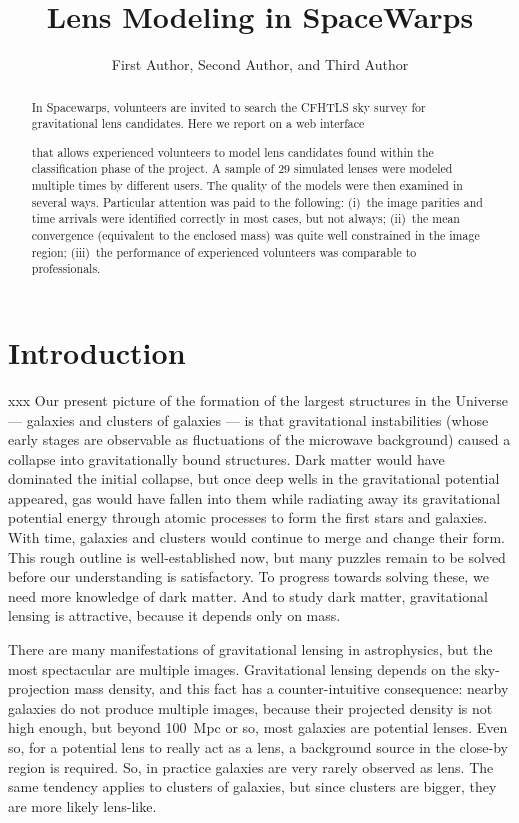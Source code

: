 \documentclass[12pt,preprint]{aastex}
\newcommand{\sw}{SpaceWarps\xspace}
\newcommand{\todo}[2][red]{%

\textcolor{#1}{\textbullet}%
\marginpar{\colorbox{#1}{\parbox{\marginparwidth}{%
\setstretch{0.4}\sffamily\textcolor{black}{\scriptsize{#2}}}}}}
\begin{document}
\title{Lens Modeling in \sw}
\author{First Author,
Second Author, and
Third Author}

\begin{abstract}
In Spacewarps, volunteers are invited to search the CFHTLS sky survey for
gravitational lens candidates.  Here we report on a web interface    \todo[red]{or should that be application?} that allows experienced
volunteers to model lens candidates found within the classification phase of the project. A sample of 29 simulated lenses
were modeled multiple times by different users.  The quality of the models were then
examined in several ways.  Particular attention was paid to the following: (i)~the image parities and
time arrivals were identified correctly in most cases, but not
always; (ii)~the mean convergence (equivalent to the enclosed mass)
was quite well constrained in the image region; (iii)~the performance
of experienced volunteers was comparable to professionals.
\end{abstract}

\keywords{}
\section{Introduction}

xxx
Our present picture of the formation of the largest structures in the
Universe --- galaxies and clusters of galaxies --- is that
gravitational instabilities (whose early stages are observable as
fluctuations of the microwave background) caused a collapse into
gravitationally bound structures.  Dark matter would have dominated
the initial collapse, but once deep wells in the gravitational
potential appeared, gas would have fallen into them while radiating
away its gravitational potential energy through atomic processes to
form the first stars and galaxies.  With time, galaxies and clusters
would continue to merge and change their form.  This rough outline is
well-established now, but many puzzles remain to be solved before our
understanding is satisfactory.  To progress towards solving these, we
need more knowledge of dark matter.  And to study dark matter,
gravitational lensing is attractive, because it depends only on mass.

There are many manifestations of gravitational lensing in astrophysics,
but the most spectacular are multiple images.  Gravitational lensing
depends on the sky-projection mass density, and this fact has a
counter-intuitive consequence: nearby galaxies do not produce multiple
images, because their projected density is not high enough, but beyond
100~Mpc or so, most galaxies are potential lenses.  Even so, for a
potential lens to really act as a lens, a background source in the close-by
region is required.  So, in practice galaxies are very rarely observed
as lens.  The same tendency applies to clusters of galaxies, but since
clusters are bigger, they are more likely lens-like.
\end{document}
